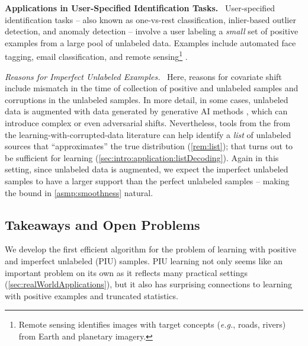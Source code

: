 \documentclass[11pt]{article}
\theoremstyle{plain}
\theoremstyle{definition}
\theoremstyle{remark}
\renewcommand{\paragraph}[1]{\medskip \noindent\textbf{#1}~}
\newcommand{\itparagraph}[1]{\medskip \noindent\textit{#1}~}
\newcommand{\eg}{\textit{e.g.}}
\begin{document}
        
        
        
    
  \paragraph{Applications in User-Specified Identification Tasks.}
      User-specified identification tasks -- also known as one-vs-rest classification, inlier-based outlier detection, and anomaly detection -- involve a user labeling a \textit{small} set of positive examples from a large pool of unlabeled data.
      Examples include automated face tagging, email classification, and remote sensing\footnote{Remote sensing identifies images with target concepts (\eg{}, roads, rivers) from Earth and planetary imagery.} \cite{plessis15convex,bekker2020learning,wenkai2011remoteSensingPU}.

      \itparagraph{Reasons for Imperfect Unlabeled Examples.}
      Here, reasons for covariate shift include mismatch in the time of collection of positive and unlabeled samples and corruptions in the unlabeled samples.
      In more detail, in some cases, unlabeled data is augmented with data generated by generative AI methods \cite{doi:10.1126/science.adi6000,rubin2004multiple,raghunathan2021syntheticData,jordon2022synthetic}, which
            can introduce complex or even adversarial shifts.
            Nevertheless, tools from the from the learning-with-corrupted-data literature can help identify a \textit{list} of unlabeled sources that ``approximates'' the true distribution (\cref{rem:list}); that turns out to be sufficient for learning (\cref{sec:intro:application:listDecoding}).
      Again in this setting, since unlabeled data is augmented, we expect the imperfect unlabeled samples to have a larger support than the perfect unlabeled samples -- making the bound in \cref{asmp:smoothness} natural.
         


    \subsection{Takeaways and Open Problems}\label{sec:takeawaysOpenProblems}\label{sec:intro:takeawaysOpenProblems}
        We develop the first efficient algorithm for the problem of learning with positive and imperfect unlabeled (PIU) samples. 
        PIU learning not only seems like an important problem on its own as it reflects many practical settings (\cref{sec:realWorldApplications}), but it also has surprising connections to learning with positive examples and truncated statistics. 
        
\end{document}
